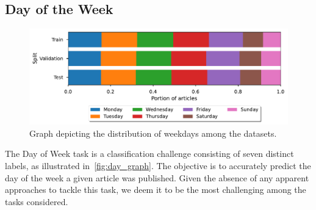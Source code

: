 \subsection{Day of the Week}
\begin{figure}[h]
    \centering
    \includegraphics[width=1.0\textwidth]{img/tasks_graph/day_of_week.pdf}
    \caption{Graph depicting the distribution of weekdays among the datasets.}
    \label{fig:day_graph}
\end{figure}
The Day of Week task is a classification challenge consisting of seven distinct labels, as illustrated in~\autoref{fig:day_graph}.
The objective is to
accurately predict the day of the week a given article was published. Given the
absence of any apparent approaches to tackle this task, we deem it to be the
most challenging among the tasks considered.